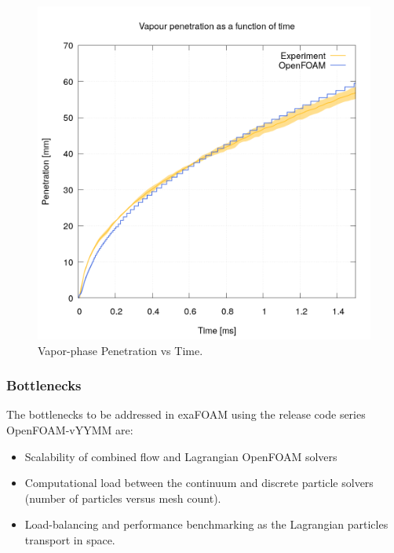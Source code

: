 \begin{figure}[H]
    \centering
    \includegraphics[width=0.9\linewidth]{figs/MB18/vapour_penetration.png}
    \caption{Vapor-phase Penetration vs Time.}
    \label{fig:enter-label}
\end{figure}

\subsubsection*{Bottlenecks}
The bottlenecks to be addressed in exaFOAM using the release code series OpenFOAM-vYYMM are:
\begin{itemize}
    \item Scalability of combined flow and Lagrangian OpenFOAM solvers
    \item Computational load between the continuum and discrete particle solvers (number of particles versus mesh count).
    \item Load-balancing and performance benchmarking as the Lagrangian particles transport in space.
\end{itemize}

